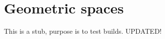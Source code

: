\documentclass[../main.tex]{subfiles}
\begin{document}
\setcounter{chapter}{2}

\section{Geometric spaces}

This is a stub, purpose is to test builds. UPDATED!
\end{document}
